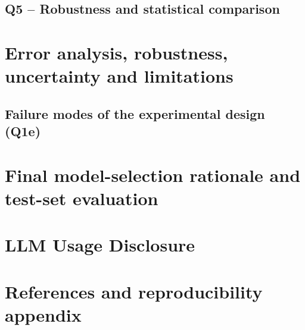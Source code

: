\documentclass[11pt,a4paper]{article}
\newcommand{\tablefile}[1]{}
\begin{document}
\subsection{Q5 -- Robustness and statistical comparison}

\section{Error analysis, robustness, uncertainty and limitations}
\label{sec:error}

\subsection*{Failure modes of the experimental design (Q1e)}

\begin{table}[H]
  \centering
  \caption{Groups of customers with identical feature values (excluding \texttt{customerID}) that are shared
           between splits.}
  \label{tab:q1e_dup_splits}
  \small\tablefile{q1e_duplicates_across_splits}
\end{table}

\section{Final model-selection rationale and test-set evaluation}
\label{sec:final}

\section{LLM Usage Disclosure}
\label{sec:llm}

\section{References and reproducibility appendix}
\label{sec:repro}
\end{document}
